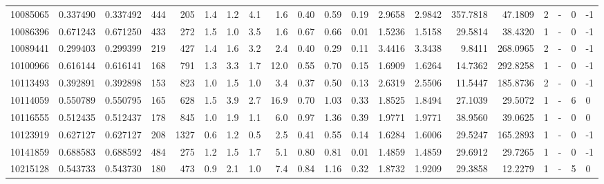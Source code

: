 \begin{tabular}{rrrrrrrrrrrrrrrrrlrl}
  10085065 & 0.337490 &   0.337492 &  444 &  205 &      1.4 &      1.2 &     4.1 &      1.6 &       0.40 &        0.59 &        0.19 &  2.9658 &  2.9842 &  357.7818 &   47.1809 &       2 &             - &        0 &        -1 \\
  10086396 & 0.671243 &   0.671250 &  433 &  272 &      1.5 &      1.0 &     3.5 &      1.6 &       0.67 &        0.66 &        0.01 &  1.5236 &  1.5158 &   29.5814 &   38.4320 &       1 &             - &        0 &        -1 \\
  10089441 & 0.299403 &   0.299399 &  219 &  427 &      1.4 &      1.6 &     3.2 &      2.4 &       0.40 &        0.29 &        0.11 &  3.4416 &  3.3438 &    9.8411 &  268.0965 &       2 &             - &        0 &        -1 \\
  10100966 & 0.616144 &   0.616141 &  168 &  791 &      1.3 &      3.3 &     1.7 &     12.0 &       0.55 &        0.70 &        0.15 &  1.6909 &  1.6264 &   14.7362 &  292.8258 &       1 &             - &        0 &        -1 \\
  10113493 & 0.392891 &   0.392898 &  153 &  823 &      1.0 &      1.5 &     1.0 &      3.4 &       0.37 &        0.50 &        0.13 &  2.6319 &  2.5506 &   11.5447 &  185.8736 &       2 &             - &        0 &        -1 \\
  10114059 & 0.550789 &   0.550795 &  165 &  628 &      1.5 &      3.9 &     2.7 &     16.9 &       0.70 &        1.03 &        0.33 &  1.8525 &  1.8494 &   27.1039 &   29.5072 &       1 &             - &        6 &         0 \\
  10116555 & 0.512435 &   0.512437 &  178 &  845 &      1.0 &      1.9 &     1.1 &      6.0 &       0.97 &        1.36 &        0.39 &  1.9771 &  1.9771 &   38.9560 &   39.0625 &       1 &             - &        0 &         0 \\
  10123919 & 0.627127 &   0.627127 &  208 & 1327 &      0.6 &      1.2 &     0.5 &      2.5 &       0.41 &        0.55 &        0.14 &  1.6284 &  1.6006 &   29.5247 &  165.2893 &       1 &             - &        0 &        -1 \\
  10141859 & 0.688583 &   0.688592 &  484 &  275 &      1.2 &      1.5 &     1.7 &      5.1 &       0.80 &        0.81 &        0.01 &  1.4859 &  1.4859 &   29.6912 &   29.7265 &       1 &             - &        0 &        -1 \\
  10215128 & 0.543733 &   0.543730 &  180 &  473 &      0.9 &      2.1 &     1.0 &      7.4 &       0.84 &        1.16 &        0.32 &  1.8732 &  1.9209 &   29.3858 &   12.2279 &       1 &             - &        5 &         0 \\

\end{tabular}
